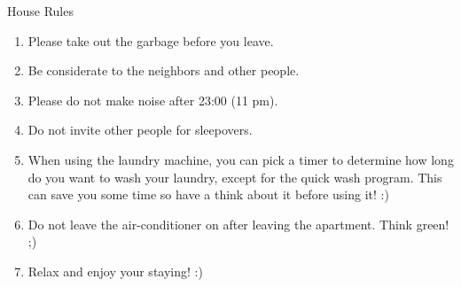 \documentclass[12pt]{article}
\begin{document}
\begin{center}
\Huge
House Rules
\end{center}
\uwave{\hspace{15cm}}
\vspace{1cm}

\begin{enumerate}
\Large
\item Please take out the garbage before you leave.
\item Be considerate to the neighbors and other people.
\item Please do not make noise after 23:00 (11 pm).
\item Do not invite other people for sleepovers.
\item When using the laundry machine, you can pick a timer to determine how long do you want to wash your laundry, except for the quick wash program. This can save you some time so have a think about it before using it! :)
\item Do not leave the air-conditioner on after leaving the apartment. Think green! ;)
\item Relax and enjoy your staying! :)
\end{enumerate}
\end{document}
